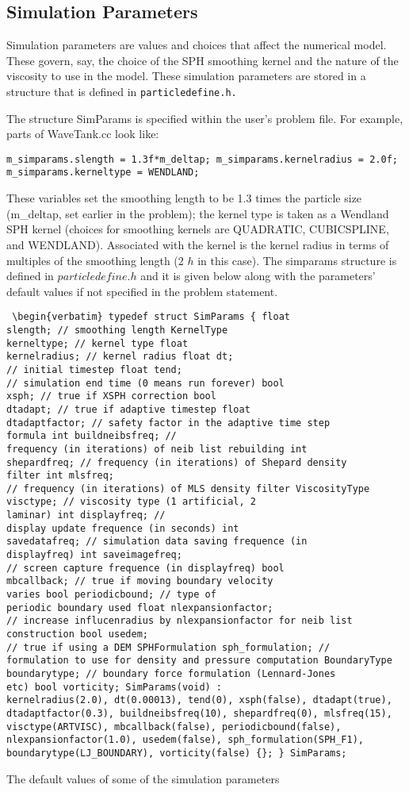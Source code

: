 \documentclass[12pt]{memoir}
\begin{document}
\subsection{Simulation Parameters}

Simulation parameters are values and choices that affect the numerical
model. These govern, say, the choice of the SPH smoothing kernel and
the nature of the viscosity to use in the model. These simulation
parameters are stored in a structure that is defined in
\verb!particledefine.h.!

The structure SimParams is specified within the user's problem file.
For example, parts of WaveTank.cc look like: \begin{verbatim}
m_simparams.slength = 1.3f*m_deltap; m_simparams.kernelradius = 2.0f;
m_simparams.kerneltype = WENDLAND; \end{verbatim} These variables set
the smoothing length to be 1.3 times the particle size (m\_deltap, set
earlier in the problem); the kernel type is taken as a Wendland SPH
kernel \cite{wendland_piecewise_1995} (choices for smoothing kernels are
QUADRATIC, CUBICSPLINE, and WENDLAND). Associated with the kernel is
the kernel radius in terms of multiples of the smoothing length (2 $h$
in this case). The simparams structure is defined in
$particledefine.h$ and it is given below along with the parameters'
default values if not specified in the problem statement.
\begin{verbatim} \begin{verbatim} typedef struct SimParams { float
slength; // smoothing length KernelType
kerneltype; // kernel type float
kernelradius; // kernel radius float dt;
// initial timestep float tend;
// simulation end time (0 means run forever) bool
xsph; // true if XSPH correction bool
dtadapt; // true if adaptive timestep float
dtadaptfactor; // safety factor in the adaptive time step
formula int buildneibsfreq; //
frequency (in iterations) of neib list rebuilding int
shepardfreq; // frequency (in iterations) of Shepard density
filter int mlsfreq;
// frequency (in iterations) of MLS density filter ViscosityType
visctype; // viscosity type (1 artificial, 2
laminar) int displayfreq; //
display update frequence (in seconds) int
savedatafreq; // simulation data saving frequence (in
displayfreq) int saveimagefreq;
// screen capture frequence (in displayfreq) bool
mbcallback; // true if moving boundary velocity
varies bool periodicbound; // type of
periodic boundary used float nlexpansionfactor;
// increase influcenradius by nlexpansionfactor for neib list
construction bool usedem;
// true if using a DEM SPHFormulation sph_formulation; //
formulation to use for density and pressure computation BoundaryType
boundarytype; // boundary force formulation (Lennard-Jones
etc) bool vorticity; SimParams(void) :
kernelradius(2.0), dt(0.00013), tend(0), xsph(false), dtadapt(true),
dtadaptfactor(0.3), buildneibsfreq(10), shepardfreq(0), mlsfreq(15),
visctype(ARTVISC), mbcallback(false), periodicbound(false),
nlexpansionfactor(1.0), usedem(false), sph_formulation(SPH_F1),
boundarytype(LJ_BOUNDARY), vorticity(false) {}; } SimParams;

\end{verbatim} The default values of some of the simulation parameters
\end{document}
